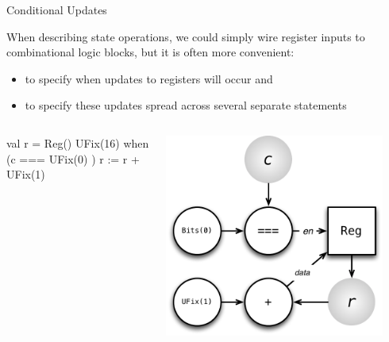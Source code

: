 \documentclass[xcolor=pdflatex,dvipsnames,table]{beamer}
\begin{document}
\begin{frame}[fragile]{Conditional Updates}

When describing state operations, we could simply wire register inputs to combinational logic blocks, but it is often more convenient:
\begin{itemize}
\item to specify when updates to registers will occur and
\item to specify these updates spread across several separate statements
\end{itemize}

\begin{columns}
\begin{scala}
val r = Reg() { UFix(16) }
when (c === UFix(0) ) {
  r := r + UFix(1)
}
\end{scala}


\begin{center}
\includegraphics[width=0.9\textwidth]{figs/conditional-increment.pdf} 
\end{center}

\end{columns}
\end{frame}
\end{document}
